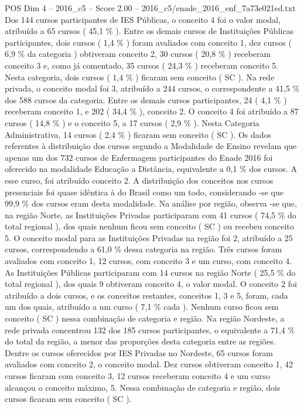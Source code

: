 \begin{textsample}{POS Dim 4 – 2016\_c5 – Score 2.00 – 2016\_c5/enade\_2016\_enf\_7a73e021ed.txt}
Dos 144 cursos participantes de IES Públicas, o conceito 4 foi o valor modal, atribuído a 65 cursos ( 45,1 \% ).
Entre os demais cursos de Instituições Públicas participantes, dois cursos ( 1,4 \% ) foram avaliados com conceito 1, dez cursos ( 6,9 \% da categoria ) obtiveram conceito 2, 30 cursos ( 20,8 \% ) receberam conceito 3 e, como já comentado, 35 cursos ( 24,3 \% ) receberam conceito 5.
Nesta categoria, dois cursos ( 1,4 \% ) ficaram sem conceito ( SC ).
Na rede privada, o conceito modal foi 3, atribuído a 244 cursos, o correspondente a 41,5 \% dos 588 cursos da categoria.
Entre os demais cursos participantes, 24 ( 4,1 \% ) receberam conceito 1, e 202 ( 34,4 \% ), conceito 2.
O conceito 4 foi atribuído a 87 cursos ( 14,8 \% ) e o conceito 5, a 17 cursos ( 2,9 \% ).
Nesta Categoria Administrativa, 14 cursos ( 2,4 \% ) ficaram sem conceito ( SC ).
Os dados referentes à distribuição dos cursos segundo a Modalidade de Ensino revelam que apenas um dos 732 cursos de Enfermagem participantes do Enade 2016 foi oferecido na modalidade Educação a Distância, equivalente a 0,1 \% dos cursos.
A esse curso, foi atribuído conceito 2.
A distribuição dos conceitos nos cursos presenciais foi quase idêntica à do Brasil como um todo, considerando -se que 99,9 \% dos cursos eram desta modalidade.
Na análise por região, observa -se que, na região Norte, as Instituições Privadas participaram com 41 cursos ( 74,5 \% do total regional ), dos quais nenhum ficou sem conceito ( SC ) ou recebeu conceito 5.
O conceito modal para as Instituições Privadas na região foi 2, atribuído a 25 cursos, correspondendo a 61,0 \% dessa categoria na região.
Três cursos foram avaliados com conceito 1, 12 cursos, com conceito 3 e um curso, com conceito 4.
As Instituições Públicas participaram com 14 cursos na região Norte ( 25,5 \% do total regional ), dos quais 9 obtiveram conceito 4, o valor modal.
O conceito 2 foi atribuído a dois cursos, e os conceitos restantes, conceitos 1, 3 e 5, foram, cada um dos quais, atribuído a um curso ( 7,1 \% cada ).
Nenhum curso ficou sem conceito ( SC ) nessa combinação de categoria e região.
Na região Nordeste, a rede privada concentrou 132 dos 185 cursos participantes, o equivalente a 71,4 \% do total da região, a menor das proporções desta categoria entre as regiões.
Dentre os cursos oferecidos por IES Privadas no Nordeste, 65 cursos foram avaliados com conceito 2, o conceito modal.
Dez cursos obtiveram conceito 1, 42 cursos ficaram com conceito 3, 12 cursos receberam conceito 4 e um curso alcançou o conceito máximo, 5.
Nessa combinação de categoria e região, dois cursos ficaram sem conceito ( SC ).

\end{textsample}

